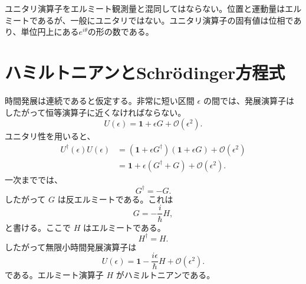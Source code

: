 \begin{classroomqa}
\end{classroomqa}


ユニタリ演算子をエルミート観測量と混同してはならない。位置と運動量はエルミートであるが、一般にユニタリではない。ユニタリ演算子の固有値は位相であり、単位円上にある\(e^{i\theta}\)の形の数である。

\begin{classroomqa}
\end{classroomqa}


\section{ハミルトニアンとSchr\"odinger方程式}

時間発展は連続であると仮定する。非常に短い区間 \(\epsilon\) の間では、発展演算子はしたがって恒等演算子に近くなければならない。
\begin{equation}
U(\epsilon)=\mathbf 1+\epsilon G+\mathcal O(\epsilon^2).
\end{equation}
ユニタリ性を用いると、
\begin{align}
U^\dagger(\epsilon)U(\epsilon)
&=
\left(\mathbf 1+\epsilon G^\dagger\right)
\left(\mathbf 1+\epsilon G\right)
+\mathcal O(\epsilon^2)
\\
&=
\mathbf 1+\epsilon(G^\dagger+G)
+\mathcal O(\epsilon^2).
\end{align}
一次まででは、
\begin{equation}
G^\dagger=-G.
\end{equation}
したがって \(G\) は反エルミートである。これは
\begin{equation}
G=-\frac{i}{\hbar}H,
\end{equation}
と書ける。ここで \(H\) はエルミートである。
\begin{equation}
H^\dagger=H.
\end{equation}
したがって無限小時間発展演算子は
\begin{equation}
U(\epsilon)
=
\mathbf 1-\frac{i\epsilon}{\hbar}H
+\mathcal O(\epsilon^2).
\end{equation}
である。エルミート演算子 \(H\) がハミルトニアンである。

